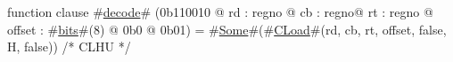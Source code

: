 function clause #\hyperref[zdecode]{decode}# (0b110010 @ rd : regno @ cb : regno@ rt : regno @ offset : #\hyperref[zbits]{bits}#(8) @ 0b0 @ 0b01) = #\hyperref[zSome]{Some}#(#\hyperref[zCLoad]{CLoad}#(rd, cb, rt, offset, false, H, false)) /* CLHU */
